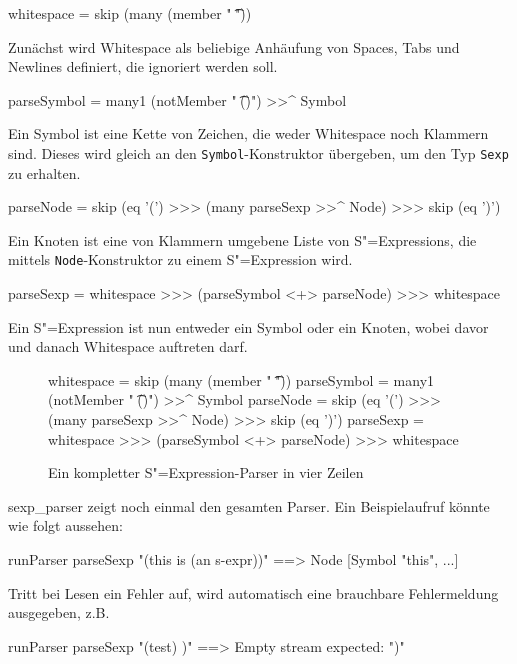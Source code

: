\documentclass[12pt, a4paper, bibgerm]{scrbook}
\newenvironment{DIFnomarkup}{}{}
\newcommand\icode[1]{\lstinline?#1?}
\newcommand\abb{}
\newcommand{\sexp}{S"=Expression}
\newcommand{\sexps}{S"=Expressions}
\begin{document}
\begin{DIFnomarkup}\begin{code}
whitespace = skip (many (member " \t\n"))
\end{code}\end{DIFnomarkup}
Zunächst wird Whitespace als beliebige Anhäufung von Spaces, Tabs und
Newlines definiert, die ignoriert werden soll.
\begin{DIFnomarkup}\begin{code}
parseSymbol = many1 (notMember " \t\n()") >>^ Symbol
\end{code}\end{DIFnomarkup} %
Ein Symbol ist eine Kette von Zeichen, die weder Whitespace noch
Klammern sind. Dieses wird gleich an den \icode{Symbol}-Konstruktor
übergeben, um den Typ \icode{Sexp} zu erhalten.
\begin{DIFnomarkup}\begin{code}
parseNode = skip (eq '(') >>> (many parseSexp >>^ Node) >>> skip (eq ')')
\end{code}\end{DIFnomarkup} %
Ein Knoten ist eine von Klammern umgebene Liste von \sexps{}, die
mittels \icode{Node}-Konstruktor zu einem \sexp{} wird.
\begin{DIFnomarkup}\begin{code}
parseSexp = whitespace >>> (parseSymbol <+> parseNode) >>> whitespace
\end{code}\end{DIFnomarkup} %
Ein \sexp{} ist nun entweder ein Symbol oder ein Knoten, wobei davor und
danach Whitespace auftreten darf.

\begin{figure}[h]
\begin{DIFnomarkup}\begin{code}
whitespace  = skip (many (member " \t\n"))
parseSymbol = many1 (notMember " \t\n()") >>^ Symbol
parseNode   = skip (eq '(') >>> (many parseSexp >>^ Node) >>> skip (eq ')')
parseSexp   = whitespace >>> (parseSymbol <+> parseNode) >>> whitespace    
  \end{code}\end{DIFnomarkup}
  \caption{Ein kompletter \sexp{}-Parser in vier Zeilen}
  \label{magicl:fig:sexp_parser}
\end{figure}

\abb{sexp_parser} zeigt noch einmal den gesamten Parser. Ein
Beispielaufruf könnte wie folgt aussehen:
\begin{code}
runParser parseSexp "(this is (an s-expr))"  ==> Node [Symbol "this", ...]
\end{code}
Tritt bei Lesen ein Fehler auf, wird automatisch eine brauchbare
Fehlermeldung ausgegeben, z.B.
\begin{DIFnomarkup}\begin{code}
runParser parseSexp "(test) )"  ==>  Empty stream expected: ")"
\end{code}\end{DIFnomarkup}
\end{document}
